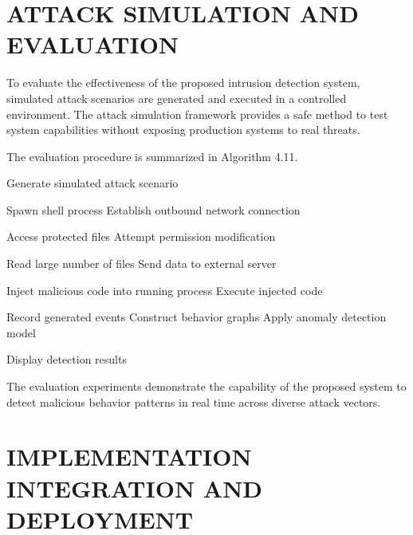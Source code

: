 \section{\uppercase{ATTACK SIMULATION AND EVALUATION}}

To evaluate the effectiveness of the proposed intrusion detection system, simulated attack scenarios are generated and executed in a controlled environment. The attack simulation framework provides a safe method to test system capabilities without exposing production systems to real threats.

The evaluation procedure is summarized in Algorithm 4.11.

\begin{algorithm}
\caption{Attack Simulation and Evaluation}
\begin{algorithmic}[1]

\State Generate simulated attack scenario

\State Spawn shell process
\State Establish outbound network connection
\EndIf

\State Access protected files
\State Attempt permission modification
\EndIf

\State Read large number of files
\State Send data to external server
\EndIf

\State Inject malicious code into running process
\State Execute injected code
\EndIf

\State Record generated events
\State Construct behavior graphs
\State Apply anomaly detection model

\State Display detection results

\end{algorithmic}
\end{algorithm}

The evaluation experiments demonstrate the capability of the proposed system to detect malicious behavior patterns in real time across diverse attack vectors.

\section{\uppercase{IMPLEMENTATION INTEGRATION AND DEPLOYMENT}}


